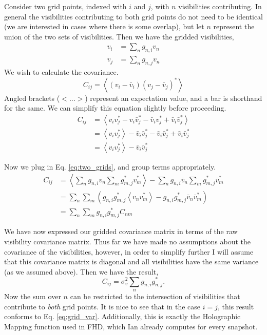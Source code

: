 \documentclass{article}
\begin{document}
Consider two grid points, indexed with $i$ and $j$, with $n$ visibilities contributing. In general the visibilities contributing to both grid points do not need to be identical (we are interested in cases where there is some overlap), but let $n$ represent the union of the two sets of visibilities. Then we have the gridded visibilities,
\begin{subequations} \label{eq:two_grids}
\begin{align} 
v_i &= \sum_n g_{n,i} v_n  \\
v_j &= \sum_n g_{n,j} v_n 
\end{align}
\end{subequations}
We wish to calculate the covariance.
\begin{equation}
C_{ij} = \left<(v_i-\bar{v}_i)(v_j-\bar{v}_j)^*\right>
\end{equation}
Angled brackets ($<...>$) represent an expectation value, and a bar is shorthand for the same. We can simplify this equation slightly before proceeding.
\begin{subequations}
\begin{align}
C_{ij} &= \left<v_iv_j^* - v_i\bar{v}_j^* - \bar{v}_iv_j^* + \bar{v}_i\bar{v}_j^*\right> \\
&= \left<v_iv_j^*\right> - \bar{v}_i\bar{v}_j^* - \bar{v}_i\bar{v}_j^* + \bar{v}_i\bar{v}_j^* \\
& = \left<v_iv_j^*\right> - \bar{v}_i\bar{v}_j^*
\end{align}
\end{subequations}

Now we plug in Eq. \ref{eq:two_grids}, and group terms appropriately.
\begin{subequations}
\begin{align}
C_{ij} &= \left<\sum_n g_{n,i}v_n \sum_m g_{m,j}^* v_m^* \right> - \sum_n g_{n,i}\bar{v}_n \sum_m g_{m,j}^* \bar{v}_m^* \\
&= \sum_n\sum_m\left(g_{n,i}g_{m,j}^* \left<v_n v_m^*\right> - g_{n,i}g_{m,j}^*\bar{v}_n\bar{v}_m^*   \right) \\
&= \sum_n\sum_m g_{n,i}g_{m,j}^* C_{nm}
\end{align}
\end{subequations}

We have now expressed our gridded covariance matrix in terms of the raw visibility covariance matrix. Thus far we have made no assumptions about the covariance of the visibilities, however, in order to simplify further I will assume that this covariance matrix is diagonal and all visibilities have the same variance (as we assumed above). Then we have the result,
\begin{equation}
C_{ij} =  \sigma_v^2 \sum_n g_{n,i}g_{n,j}^*.
\end{equation}
Now the sum over $n$ can be restricted to the intersection of visibilities that contribute to \emph{both} grid points. It is nice to see that in the case $i=j$, this result conforms to Eq. \ref{eq:grid_var}. Additionally, this is exactly the Holographic Mapping function used in FHD, which Ian already computes for every snapshot.
\end{document}
